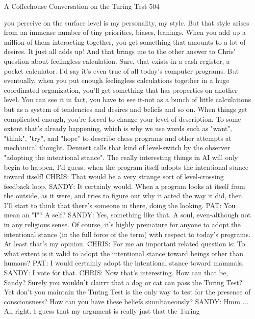 A Coffeehouse Conversation on the Turing Test                                       504

   you perceive on the surface level is my personality, my style. But that style arises
   from an immense number of tiny priorities, biases, leanings. When you add up a
   million of them interacting together, you get something that amounts to a lot of
   desires. It just all adds up! And that brings me to the other answer to Chris'
   question about feelingless calculation. Sure, that exists-in a cash register, a
   pocket calculator. I'd say it's even true of all today's computer programs. But
   eventually, when you put enough feelingless calculations together in a huge
   coordinated organization, you'll get something that has properties on another
   level. You can see it in fact, you have to see it-not as a bunch of little calculations
   but as a system of tendencies and desires and beliefs and so on. When things get
   complicated enough, you're forced to change your level of description. To some
   extent that's already happening, which is why we use words such as "want",
   "think", "try", and "hope" to describe chess programs and other attempts at
   mechanical thought. Dennett calls that kind of level-switch by the observer
   "adopting the intentional stance". The really interesting things in AI will only
   begin to happen, I'd guess, when the program itself adopts the intentional stance
   toward itself!
CHRIS: That would be a very strange sort of level-crossing feedback loop.
SANDY: It certainly would. When a program looks at itself from the outside, as it
   were, and tries to figure out why it acted the way it did, then I'll start to think that
   there's someone in there, doing the looking.
PAT: You mean an "I"? A self?
SANDY: Yes, something like that. A soul, even-although not in any religious sense.
   Of course, it's highly premature for anyone to adopt the intentional stance (in the
   full force of the term) with respect to today's programs. At least that's my
   opinion.
CHRIS: For me an important related question is: To what extent is it valid to adopt
   the intentional stance toward beings other than humans?
PAT: I would certainly adopt the intentional stance toward mammals.
SANDY: I vote for that.
CHRIS: Now that's interesting. How can that be, Sandy? Surely you wouldn't clairrr
   that a dog or cat can pass the Turing Test? Yet don't you maintain the Turing
   Test is the only way to test for the presence of consciousness? How can you have
   these beliefs simultaneously?
SANDY: Hmm ... All right. I guess that my argument is really just that the Turing
